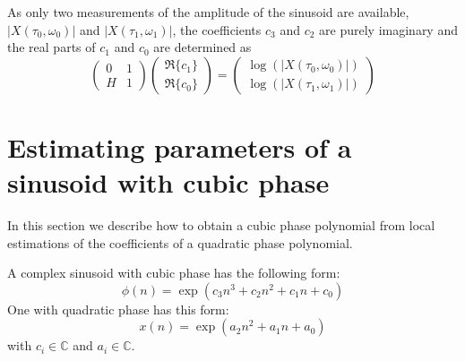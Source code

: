 As only two measurements of the amplitude of the sinusoid are available,
$|X(\tau_0,\omega_0)|$ and $|X(\tau_1,\omega_1)|$, the coefficients
$c_3$ and $c_2$ are purely imaginary and the real parts of $c_1$ and $c_0$ are
determined as
\begin{equation}
    \begin{pmatrix}
        0 & 1 \\
        H & 1
    \end{pmatrix}
    \begin{pmatrix}
        \Re\{c_1\} \\
        \Re\{c_0\}
    \end{pmatrix}
    =
    \begin{pmatrix}
        \log(|X(\tau_0,\omega_0)|) \\
        \log(|X(\tau_1,\omega_1)|)
    \end{pmatrix}
\end{equation}

\section{Estimating parameters of a sinusoid with cubic
phase\label{sec:cubicphasepolyest} }

In this section we describe how to obtain a cubic phase polynomial from
local estimations of the coefficients of a quadratic phase polynomial.

A complex sinusoid with cubic phase has the following form:
\begin{equation}
    \label{eq:cubicphasepoly}
    \phi(n) = \exp \left(c_3 n^{3} + c_2 n^{2} + c_1 n + c_0 \right)
\end{equation}
One with quadratic phase has this form:
\begin{equation}
    \label{eq:quadraticphasepoly}
    x(n) = \exp \left(a_2 n^{2} + a_1 n + a_0 \right)
\end{equation}
with $c_{i} \in \mathbb{C}$ and $a_{i} \in \mathbb{C}$.

